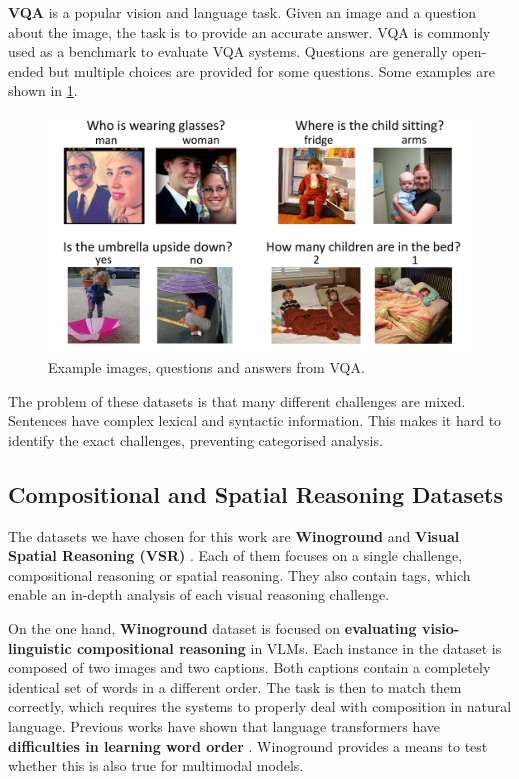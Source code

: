 \textbf{VQA} \cite{antol2015vqa} is a popular vision and language task. Given an image and a question about the image, the task is to provide an accurate answer. VQA is commonly used as a benchmark to evaluate VQA systems. Questions are generally open-ended but multiple choices are provided for some questions. Some examples are shown in \cref{fig:vqa_examples}.

\begin{figure}[ht]
    \centering
    \includegraphics[width=\linewidth]{images/datasets/vqa_examples.pdf}
    \caption{Example images, questions and answers from VQA.}
    \label{fig:vqa_examples}
\end{figure}

The problem of these datasets is that many different challenges are mixed. Sentences have complex lexical and syntactic information. This makes it hard to identify the exact challenges, preventing categorised analysis.

\subsection{Compositional and Spatial Reasoning Datasets} \label{sec:compositional_spatial_reasoning_datasets}

The datasets we have chosen for this work are \textbf{Winoground} \cite{thrush2022winoground} and \textbf{Visual Spatial Reasoning (VSR)} \cite{liu2022visual}. Each of them focuses on a single challenge, compositional reasoning or spatial reasoning. They also contain tags, which enable an in-depth analysis of each visual reasoning challenge.

On the one hand, \textbf{Winoground} dataset \cite{thrush2022winoground} is focused on \textbf{evaluating visio-linguistic compositional reasoning} in VLMs. Each instance in the dataset is composed of two images and two captions. Both captions contain a completely identical set of words in a different order. The task is then to match them correctly, which requires the systems to properly deal with composition in natural language. Previous works have shown that language transformers have \textbf{difficulties in learning word order} \cite{sinha2020unnatural,sinha2021matterslittle}. Winoground provides a means to test whether this is also true for multimodal models.

